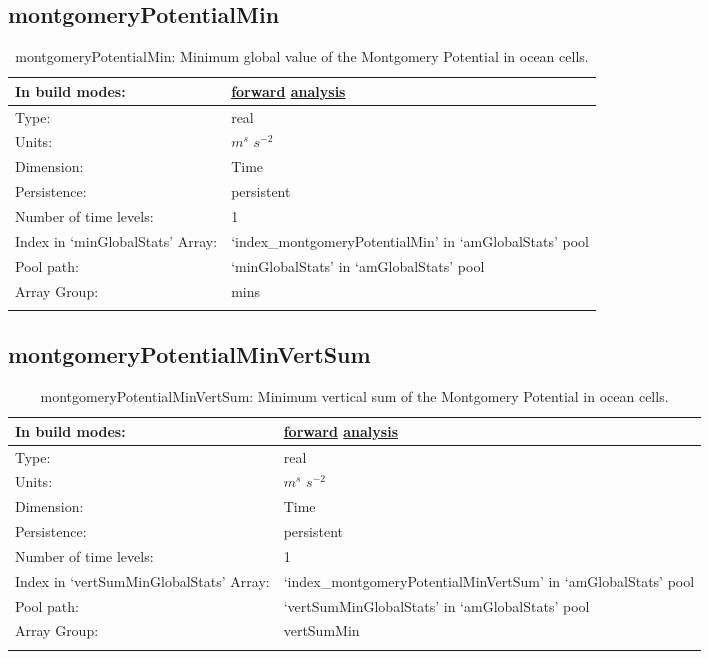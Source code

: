 \subsection[montgomeryPotentialMin]{montgomeryPotentialMin}
\label{subsec:var_sec_amGlobalStats_montgomeryPotentialMin}
\begin{center}
\begin{longtable}{| p{2.0in} | p{4.0in} |}
        \hline 
        In build modes: & \hyperref[subsec:forward_var_tab_amGlobalStats]{forward} \hyperref[subsec:analysis_var_tab_amGlobalStats]{analysis} \\
        \hline 
        Type: & real \\
        \hline 
        Units: & $m^s$ $s^{-2}$ \\
        \hline 
        Dimension: & Time \\
        \hline 
        Persistence: & persistent \\
        \hline 
        Number of time levels: & 1 \\
        \hline 
		 Index in `minGlobalStats' Array: & `index\_montgomeryPotentialMin' in `amGlobalStats' pool \\
		 \hline 
            Pool path: & `minGlobalStats' in `amGlobalStats' pool \\
		 \hline 
		 Array Group: & mins \\
		 \hline 
    \caption{montgomeryPotentialMin: Minimum global value of the Montgomery Potential in ocean cells.}
\end{longtable}
\end{center}
\subsection[montgomeryPotentialMinVertSum]{montgomeryPotentialMinVertSum}
\label{subsec:var_sec_amGlobalStats_montgomeryPotentialMinVertSum}
\begin{center}
\begin{longtable}{| p{2.0in} | p{4.0in} |}
        \hline 
        In build modes: & \hyperref[subsec:forward_var_tab_amGlobalStats]{forward} \hyperref[subsec:analysis_var_tab_amGlobalStats]{analysis} \\
        \hline 
        Type: & real \\
        \hline 
        Units: & $m^s$ $s^{-2}$ \\
        \hline 
        Dimension: & Time \\
        \hline 
        Persistence: & persistent \\
        \hline 
        Number of time levels: & 1 \\
        \hline 
		 Index in `vertSumMinGlobalStats' Array: & `index\_montgomeryPotentialMinVertSum' in `amGlobalStats' pool \\
		 \hline 
            Pool path: & `vertSumMinGlobalStats' in `amGlobalStats' pool \\
		 \hline 
		 Array Group: & vertSumMin \\
		 \hline 
    \caption{montgomeryPotentialMinVertSum: Minimum vertical sum of the Montgomery Potential in ocean cells.}
\end{longtable}
\end{center}
